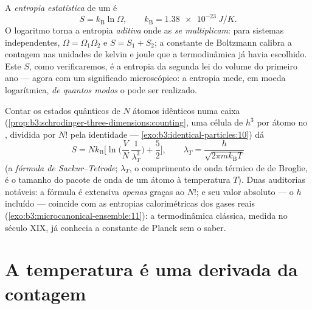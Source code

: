 \begin{definition}\label{def:b3:microcanonical-ensemble:entropy}
A \emph{entropia estatística} de um  é
\[
S = k_{\text{B}}\ln\Omega , \qquad
k_{\text{B}} = \qty{1.38e-23}{J/K} .
\]
O logaritmo torna a entropia \emph{aditiva} onde as 
\emph{se multiplicam}: para sistemas independentes,
$\Omega = \Omega_1\Omega_2$ e $S = S_1 + S_2$; a constante de Boltzmann
calibra a contagem nas unidades de kelvin e joule que a termodinâmica
já havia escolhido. Este $S$, como verificaremos, é a entropia da
segunda lei do volume do primeiro ano --- agora com um significado
microscópico: a entropia mede, em moeda logarítmica, \emph{de quantos
modos} o  pode ser realizado.
\end{definition}

\begin{proposition}\label{prop:b3:microcanonical-ensemble:gas}
Contar os estados quânticos de $N$ átomos idênticos numa caixa
(\cref{prop:b3:schrodinger-three-dimensions:counting}, uma célula de
$h^3$ por átomo no , dividida por $N!$ pela identidade
--- \cref{exo:b3:identical-particles:10}) dá
\[
S = Nk_{\text{B}}\Big[\ln\Big(\frac VN\,\frac1{\lambda_T^3}\Big)
 + \frac52\Big] , \qquad
\lambda_T = \frac{h}{\sqrt{2\pi mk_{\text{B}}T}}
\]
(a \emph{fórmula de Sackur--Tetrode}; $\lambda_T$, o comprimento de
onda térmico de de Broglie, é o tamanho do pacote de onda de um átomo à
temperatura $T$). Duas auditorias notáveis: a fórmula é extensiva
\emph{apenas} graças ao $N!$; e seu valor absoluto --- o $h$ incluído --- coincide
com as entropias calorimétricas dos gases reais
(\cref{exo:b3:microcanonical-ensemble:11}): a termodinâmica clássica,
medida no século XIX, já conhecia a constante de Planck sem o saber.
\end{proposition}
\admitted

\section{A temperatura é uma derivada da contagem}

